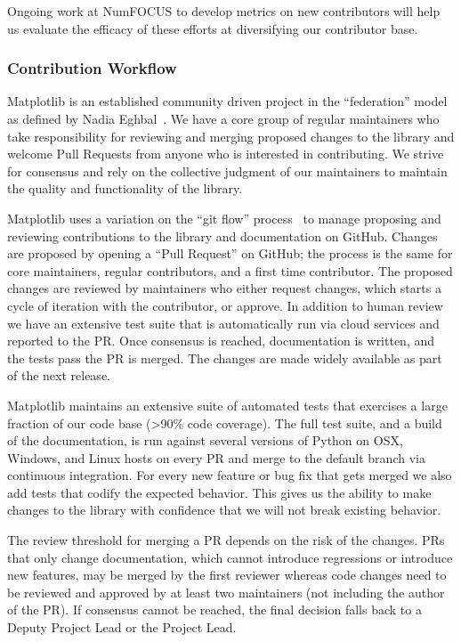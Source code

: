 \documentclass[12pt]{article}
\numberwithin{page}{section}
\begin{document}
Ongoing work at NumFOCUS to develop metrics on new contributors
will help us evaluate the
efficacy of these efforts at diversifying our contributor base.

\subsubsection{Contribution Workflow}

Matplotlib is an established community driven project in the
``federation'' model as defined by Nadia Eghbal~\cite{eghbal_2020}.
We have a core group of regular maintainers who take responsibility for
reviewing and merging proposed changes to the library and welcome Pull
Requests from anyone who is interested in contributing.  We strive
for consensus and rely on the collective judgment of our maintainers
to maintain the quality and functionality of the library.

Matplotlib uses a variation on the ``git flow'' process~\cite{ghflow}
to manage proposing and reviewing contributions to the library and
documentation on GitHub.  Changes are proposed by opening a ``Pull
Request'' on GitHub; the process is the same for core maintainers,
regular contributors, and a first time contributor.  The proposed
changes are reviewed by maintainers who either request changes, which
starts a cycle of iteration with the contributor, or approve.  In
addition to human review we have an extensive test suite that is
automatically run via cloud services and reported to
the PR.  Once consensus is reached, documentation is written,
and the tests pass the PR is merged.  The changes are made widely available
as part of the next release.

Matplotlib maintains an extensive suite of automated tests that
exercises a large fraction of our code base (>90\% code coverage).  The full test suite, and
a build of the documentation, is run against several versions of
Python on OSX, Windows, and Linux hosts on every PR and merge to the
default branch via continuous integration.  For every new feature or
bug fix that gets merged we also add tests that codify the expected
behavior.  This gives us the ability to make changes to the library
with confidence that we will not break existing behavior.

The review threshold for merging a PR depends on the risk of the changes.  PRs
that only change documentation, which cannot introduce regressions or introduce
new features, may be merged by the first reviewer whereas code changes need to
be reviewed and approved by at least two maintainers (not including the author
of the PR).  If consensus cannot be reached, the final decision falls back to a
Deputy Project Lead or the Project Lead.
\end{document}
